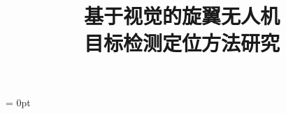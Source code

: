 \documentclass[twoside,UTF8]{nputhesis}
\title[Research on Vision-based Object Detection and Localization for Rotorcraft UAVs]{基于视觉的旋翼无人机\\目标检测定位方法研究}
\begin{document}
\makecover  %
\frontmatter


\tableofcontents 
\mainmatter  %

\parskip = 0pt %













\backmatter




\Thanks



\statement
\end{document}
